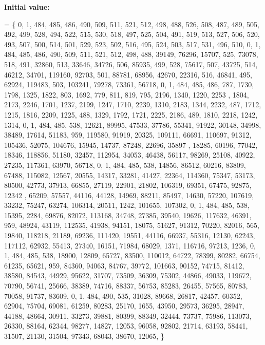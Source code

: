 {\bfseries Initial value\+:}
\begin{DoxyCode}
= \{
    0, 1, 484, 485, 486, 490, 509, 511, 521, 512, 498, 488, 526, 508, 487, 489, 505, 492, 499, 528, 494, 
      522, 515, 530, 518, 497, 525, 504, 491, 519, 513, 527, 506, 520, 493, 507, 500, 514, 501, 529, 523, 502, 516, 
      495, 524, 503, 517, 531, 496, 510, 
    0, 1, 484, 485, 486, 490, 509, 511, 521, 512, 498, 488, 39149, 76296, 15707, 525, 73078, 518, 491, 
      32860, 513, 33646, 34726, 506, 85935, 499, 528, 75617, 507, 43725, 514, 46212, 34701, 119160, 92703, 501, 88781,
       68956, 42670, 22316, 516, 46841, 495, 62924, 119483, 503, 103241, 79278, 73361, 56718, 
    0, 1, 484, 485, 486, 787, 1730, 1798, 1325, 1822, 803, 1692, 779, 811, 819, 795, 2196, 1340, 1220, 2253
      , 1804, 2173, 2246, 1701, 1237, 2199, 1247, 1710, 2239, 1310, 2183, 1344, 2232, 487, 1712, 1215, 1816, 2209,
       1225, 488, 1329, 1792, 1721, 2225, 2186, 489, 1810, 2218, 1242, 1314, 
    0, 1, 484, 485, 538, 12621, 89995, 47533, 37786, 55341, 91922, 30148, 34998, 38489, 17614, 51183, 959, 
      119580, 91919, 20325, 109111, 66691, 110697, 91312, 105436, 52075, 104676, 15945, 14737, 87248, 22696, 35897
      , 18285, 60196, 77042, 18346, 118856, 51180, 32457, 112954, 34053, 46438, 56117, 98269, 25108, 40922, 27235,
       117361, 63970, 56718, 
    0, 1, 484, 485, 538, 14856, 86512, 60216, 83809, 67488, 115082, 12567, 20555, 14317, 33281, 41427, 
      22364, 114360, 75347, 53173, 80500, 42773, 37913, 66855, 27119, 22901, 21802, 106319, 69351, 67475, 92875, 12342
      , 65209, 57557, 44116, 44128, 14969, 88211, 85497, 14630, 57220, 107619, 33232, 75247, 63274, 106314, 20511,
       1242, 101655, 107302, 
    0, 1, 484, 485, 538, 15395, 2284, 69876, 82072, 113168, 34748, 27385, 39540, 19626, 117632, 46391, 959,
       48924, 43119, 112535, 41938, 94151, 18075, 51627, 91312, 70220, 82016, 565, 19840, 118218, 21189, 69236, 
      111420, 19551, 44116, 66937, 55316, 12130, 62243, 117112, 62932, 55413, 27340, 16151, 71984, 68029, 1371, 
      116716, 97213, 1236, 
    0, 1, 484, 485, 538, 18900, 12809, 65727, 83500, 110012, 64722, 78399, 80282, 66754, 61235, 65621, 959,
       84360, 94063, 84767, 39772, 101663, 90152, 74715, 81412, 38580, 84543, 44929, 95622, 31707, 73509, 36309, 
      75302, 44866, 49033, 119672, 70790, 56741, 25666, 38389, 74716, 88337, 56753, 85283, 26455, 57565, 80783, 
      70058, 91737, 83609, 
    0, 1, 484, 490, 535, 31028, 89668, 26817, 42457, 60352, 62904, 75704, 69081, 61259, 80283, 25170, 1655,
       43950, 29573, 36295, 28947, 44188, 48664, 30911, 33273, 39881, 80399, 88349, 32444, 73737, 75986, 113073, 
      26330, 88164, 62344, 98277, 14827, 12053, 96058, 92802, 21714, 63193, 58441, 31507, 21130, 31504, 97343, 
      68043, 38670, 12065, 
\}
\end{DoxyCode}
\mbox{\label{data___b_l_t_8_c_a8c1f858ba9f1d8abc4321bc95ee91bee}} 
